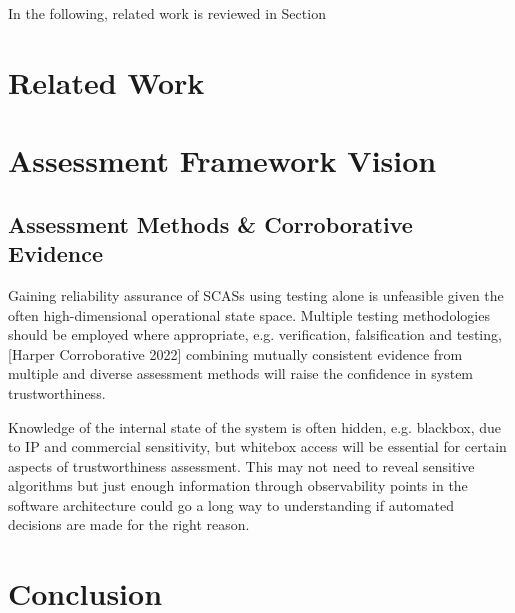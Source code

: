 In the following, related work is reviewed in Section

\section{Related Work}\label{Related_work}


\section{Assessment Framework Vision}\label{Assessment_Framework_Vision}


\subsection{Assessment Methods \& Corroborative Evidence}
Gaining reliability assurance of SCASs using testing alone is unfeasible given the often high-dimensional operational state space. Multiple testing methodologies should be employed where appropriate, e.g. verification, falsification and testing, [Harper Corroborative 2022] combining mutually consistent evidence from multiple and diverse assessment methods will raise the confidence in system trustworthiness.

Knowledge of the internal state of the system is often hidden, e.g. blackbox, due to IP and commercial sensitivity, but whitebox access will be essential for certain aspects of trustworthiness assessment. This may not need to reveal sensitive algorithms but just enough information through observability points in the software architecture could go a long way to understanding if automated decisions are made for the right reason\cite{koopman2018toward}. 



\section{Conclusion}\label{conclusion}
